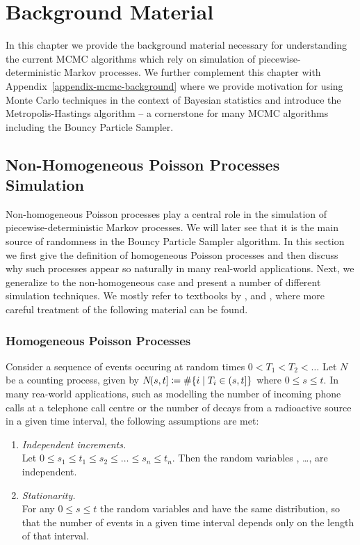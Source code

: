 \documentclass[report.tex]{subfiles}
\begin{document}
\chapter{Background Material}

In this chapter we provide the background material necessary for understanding the
current MCMC algorithms which rely on simulation of
piecewise-deterministic Markov processes.
We further complement this chapter with Appendix~\ref{appendix-mcmc-background}
where we provide motivation for using Monte Carlo techniques in the context of
Bayesian statistics and
introduce the Metropolis-Hastings algorithm
-- a cornerstone for many MCMC algorithms including the Bouncy Particle Sampler.


\section{Non-Homogeneous Poisson Processes Simulation}
\label{background-material-poisson-processes}


Non-homogeneous Poisson processes play a central role in the simulation of
piecewise-deterministic Markov processes. We will later see that it is
the main source of randomness in the Bouncy Particle Sampler algorithm.
In this section we first give the definition of homogeneous Poisson processes
and then discuss why such processes appear so naturally in many real-world applications.
Next, we generalize to the non-homogeneous case and present a number of different
simulation techniques.
We mostly refer to textbooks by
\citet{devroye2013non},
\citet{feller1968Introduction} and
\citet{ross1996stochastic},
where more careful treatment of the following material can be found.

\subsection{Homogeneous Poisson Processes}

Consider a sequence of events occuring at random times
$0 < T_{1} < T_{2} < \dots$ Let $N$ be a counting process, given by
${N}\!({s},{t}] \coloneqq \# \{ i \mid T_{i} \in (s, t] \}$ where
$0 \leq s \leq t$.
In many rea-world applications, such as modelling the number of incoming
phone calls at a telephone call centre or the number of decays from a
radioactive source in a given time interval, the following assumptions are met:

\begin{enumerate}
  \item \textit{Independent increments.} \\
  Let $0 \leq s_{1} \leq t_{1} \leq s_{2} \leq \dots \leq s_{n} \leq t_{n}$.
  Then the random variables
  , \dots, 
  are independent.

  \item \textit{Stationarity.} \\
  For any $0 \leq s \leq t$ the random variables
   and 
  have the same distribution, so that the number of events in a given time
  interval depends only on the length of that interval.
\end{enumerate}
\end{document}
